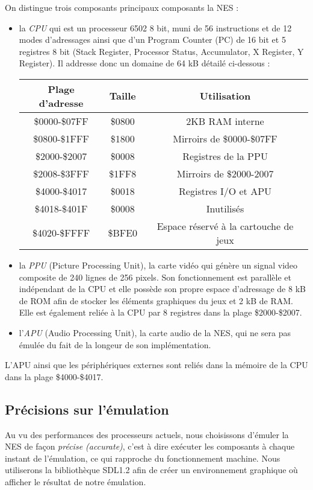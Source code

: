 On distingue trois composants principaux composants la NES :
\begin{itemize}
\item la \emph{CPU} qui est un processeur 6502 8 bit, muni de 56 instructions et de 12 modes d'adressages ainsi que d'un Program Counter (PC) de 16 bit et 5 registres 8 bit (Stack Register, Processor Status, Accumulator, X Register, Y Register). Il addresse donc un domaine de 64 kB détailé ci-dessous :

\begin{center}
\begin{tabular}{|c|c|c|}
  \hline
  Plage d'adresse & Taille & Utilisation \\
  \hline
  \$0000-\$07FF & \$0800 & 2KB RAM interne\\
  \hline
  \$0800-\$1FFF & \$1800 & Mirroirs de \$0000-\$07FF \\
  \hline
  \$2000-\$2007 & \$0008 & Registres de la PPU \\
  \hline
  \$2008-\$3FFF & \$1FF8 & Mirroirs de \$2000-2007 \\
  \hline
  \$4000-\$4017 & \$0018 & Registres I/O et APU \\
  \hline
  \$4018-\$401F & \$0008 & Inutilisés \\
  \hline
  \$4020-\$FFFF & \$BFE0 & Espace réservé à la cartouche de jeux \\
  \hline
\end{tabular}
\end{center}
\hspace{1pt}
\item la \emph{PPU} (Picture Processing Unit), la carte vidéo qui génère un signal video composite de 240 lignes de 256 pixels. Son fonctionnement est parallèle et indépendant de la CPU et elle possède son propre espace d'adressage de 8 kB de ROM afin de stocker les éléments graphiques du jeux et 2 kB de RAM. Elle est également reliée à la CPU par 8 registres dans la plage \$2000-\$2007.
\item l'\emph{APU} (Audio Processing Unit), la carte audio de la NES, qui ne sera pas émulée du fait de la longeur de son implémentation.
\end{itemize}

L'APU ainsi que les périphériques externes sont reliés dans la mémoire de la CPU dans la plage \$4000-\$4017.

\subsection{Précisions sur l'émulation}
\label{subsec:precision_sur_lemulation}
Au vu des performances des processeurs actuels, nous choisissons d'émuler la NES de façon \emph{précise (accurate)}, c'est à dire exécuter les composants à chaque instant de l'émulation, ce qui rapproche du fonctionnement machine.
Nous utiliserons la bibliothèque SDL1.2 afin de créer un environnement graphique où afficher le résultat de notre émulation.
